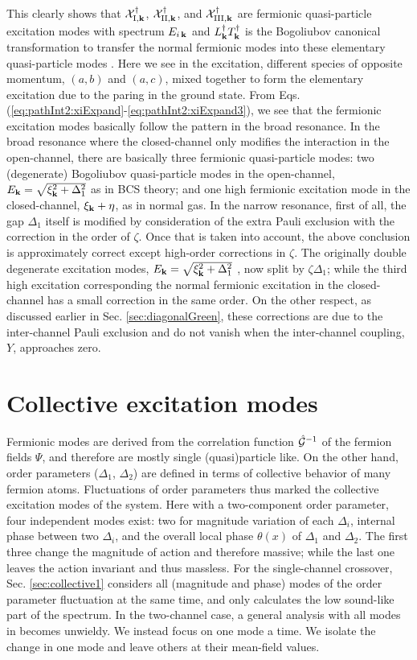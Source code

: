 This clearly shows that $\mathcal{X}^{\dagger}_{\text{I},\mathbf{k}}$, $\mathcal{X}^{\dagger}_{\text{II},\mathbf{k}}$, and $\mathcal{X}^{\dagger}_{\text{III},\mathbf{k}}$ are fermionic quasi-particle excitation modes with spectrum $E_{i\,\mathbf{k}}$ and   $L^{\dagger}_{\mathbf{k}}T^{\dagger}_{\mathbf{k}}$ is  the Bogoliubov canonical transformation to transfer the normal fermionic modes into these elementary quasi-particle modes .  Here we see in the excitation, different species of opposite momentum, $(a,b)$ and $(a,c)$, mixed together to form the elementary excitation due to the paring in the ground state.  
  From Eqs. (\ref{eq:pathInt2:xiExpand}-\ref{eq:pathInt2:xiExpand3}), we see that the fermionic excitation modes basically follow the pattern in the broad resonance.  In the broad resonance where the closed-channel only modifies the interaction in the open-channel,  there are basically three fermionic quasi-particle modes: two (degenerate) Bogoliubov quasi-particle modes  in the open-channel, $E_{\mathbf{k}}=\sqrt{\xi^{2}_{\mathbf{k}}+\Delta_{1}^{2}}$ as in BCS theory; and one high fermionic excitation mode in the closed-channel, $\xi_{\mathbf{k}}+\eta$, as in normal gas.  In the narrow resonance, first of all, the gap $\Delta_{1}$ itself is modified  by consideration of the extra Pauli exclusion with the correction in the  order of $\zeta$.  Once that is taken into account, the above conclusion is approximately correct except high-order corrections in $\zeta$.   The originally double degenerate excitation modes, $E_{\mathbf{k}}=\sqrt{\xi^{2}_{\mathbf{k}}+\Delta_{1}^{2}}$ , now split by $\zeta\Delta_{1}$; while the third high excitation corresponding the normal fermionic excitation in the closed-channel has a small correction in the same order.   On the other respect, as discussed earlier in Sec. \ref{sec:diagonalGreen}, these corrections are due to the inter-channel Pauli exclusion and do not vanish when the inter-channel coupling, $Y$, approaches zero.  

\section{Collective excitation modes}
Fermionic modes are derived from the correlation function $\hat{\mathcal{G}}^{-1}$ of the fermion fields $\Psi$, and therefore are mostly single (quasi)particle like.  On the other hand, order parameters ($\Delta_{1}$, $\Delta_{2}$) are defined in terms of collective behavior of many fermion atoms.  Fluctuations of order parameters thus marked the collective excitation modes of the system. Here with a two-component order parameter, four independent modes exist:   two for magnitude variation of each $\Delta_i$,  internal phase between two $\Delta_i$, and the overall local phase $\theta(x)$ of $\Delta_1$ and $\Delta_2$.  The first three change the magnitude of action and therefore massive; while the last one leaves the action invariant and thus massless.  
  For the single-channel crossover, Sec. \ref{sec:collective1} considers all (magnitude and phase) modes of the order parameter fluctuation at the same time, and only calculates  the low sound-like part of the spectrum. In the two-channel case, a general analysis with all modes in becomes unwieldy.  
We instead focus on one mode a time. We isolate the change in one mode and leave others at their mean-field values.  

